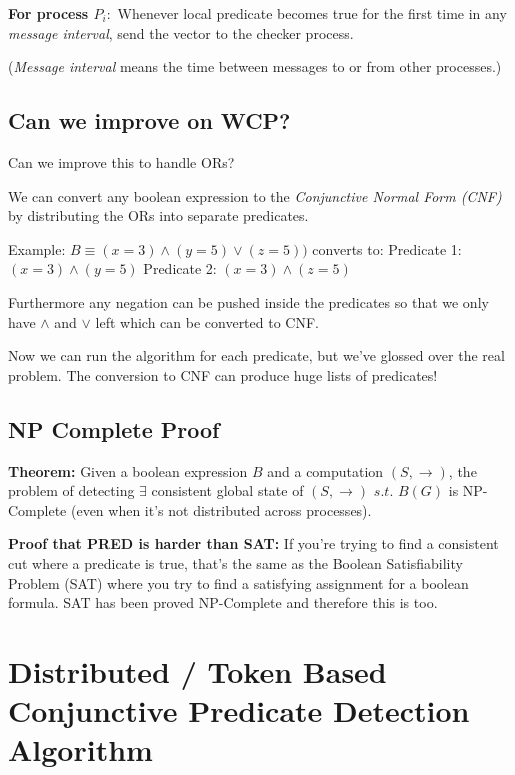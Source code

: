 \documentclass[twoside]{article}
\begin{document}
\textbf{For process $P_i:$}\newline
Whenever local predicate becomes true for the first time in any \textit{message interval}, send the vector to the checker process.

(\textit{Message interval} means the time between messages to or from other processes.)

\subsection{Can we improve on WCP?}

Can we improve this to handle ORs?

We can convert any boolean expression to the \textit{Conjunctive Normal Form (CNF)} by distributing the ORs into separate predicates.

Example:\newline
$B\equiv(x=3)\land(y=5)\lor(z=5))$
converts to:\newline
Predicate 1: $(x=3) \land (y=5)$
Predicate 2: $(x=3) \land (z=5)$

Furthermore any negation can be pushed inside the predicates so that we only have $\land$ and $\lor$ left which can be converted to CNF.

Now we can run the algorithm for each predicate, but we've glossed over the real problem. The conversion to CNF can produce huge lists of predicates!

\subsection{NP Complete Proof}

\textbf{Theorem:}\newline
Given a boolean expression $B$ and a computation $(S, \rightarrow)$, the problem of detecting $\exists$ consistent global state of $(S, \rightarrow)$ $s.t.$ $B(G)$ is NP-Complete (even when it's not distributed across processes).

\textbf{Proof that PRED is harder than SAT:}\newline
If you're trying to find a consistent cut where a predicate is true, that's the same as the Boolean Satisfiability Problem (SAT) where you try to find a satisfying assignment for a boolean formula. SAT has been proved NP-Complete and therefore this is too.

\section{Distributed / Token Based Conjunctive Predicate Detection Algorithm}
\end{document}
